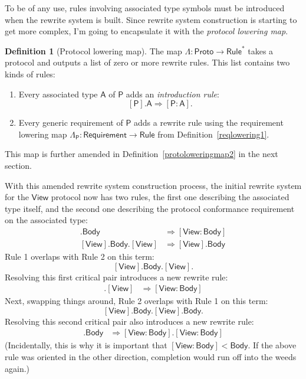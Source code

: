 \documentclass[headsepline,bibliography=totoc]{scrreport}
\newcommand{\namesym}[1]{\mathsf{#1}}
\newcommand{\proto}[1]{\bm{\mathsf{#1}}}
\newcommand{\protosym}[1]{[\proto{#1}]}
\newcommand{\assocsym}[2]{[\proto{#1}\colon\namesym{#2}]}
\theoremstyle{definition}
\theoremstyle{definition}
\newtheorem{definition}{Definition}[chapter]
\theoremstyle{definition}
\begin{document}
To be of any use, rules involving associated type symbols must be introduced when the rewrite system is built. Since rewrite system construction is starting to get more complex, I'm going to encapsulate it with the \emph{protocol lowering map}.
\begin{definition}[Protocol lowering map]\label{protoloweringmap}
The map $\Lambda\colon\namesym{Proto}\rightarrow\namesym{Rule}^*$ takes a protocol and outputs a list of zero or more rewrite rules. This list contains two kinds of rules:
\begin{enumerate}
\item Every associated type $\namesym{A}$ of $\proto{P}$ adds an \emph{introduction rule}:
\[\protosym{P}.\namesym{A}\Rightarrow\assocsym{P}{A}.\]
\item Every generic requirement of $\proto{P}$ adds a rewrite rule using the requirement lowering map $\Lambda_{\proto{P}}:\namesym{Requirement}\rightarrow\namesym{Rule}$ from Definition~\ref{reqlowering1}.
\end{enumerate}
This map is further amended in Definition~\ref{protoloweringmap2} in the next section.
\end{definition}
With this amended rewrite system construction process, the initial rewrite system for the $\proto{View}$ protocol now has two rules, the first one describing the associated type itself, and the second one describing the protocol conformance requirement on the associated type:
\begin{align}
\protosym{View}.\namesym{Body}&\Rightarrow\assocsym{View}{Body}\tag{1}\\
\protosym{View}.\namesym{Body}.\protosym{View}&\Rightarrow\protosym{View}.\namesym{Body}\tag{2}
\end{align}
Rule 1 overlaps with Rule 2 on this term:
\[\protosym{View}.\namesym{Body}.\protosym{View}.\]
Resolving this first critical pair introduces a new rewrite rule:
\begin{align}
\assocsym{View}{Body}.\protosym{View}&\Rightarrow\assocsym{View}{Body}\tag{3}
\end{align}
Next, swapping things around, Rule 2 overlaps with Rule 1 on this term:
\[\protosym{View}.\namesym{Body}.\protosym{View}.\namesym{Body}.\]
Resolving this second critical pair also introduces a new rewrite rule:
\begin{align}
\assocsym{View}{Body}.\namesym{Body}&\Rightarrow\assocsym{View}{Body}.\assocsym{View}{Body}\tag{4}
\end{align}
(Incidentally, this is why it is important that $\assocsym{View}{Body}<\namesym{Body}$. If the above rule was oriented in the other direction, completion would run off into the weeds again.)
\end{document}

